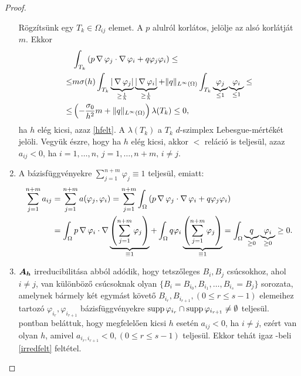 \begin{proof}
\begin{enumerate}[label=(\roman*)]
			Rögzítsünk egy $T_k \in \Omega_{ij}$ elemet. A $p$ alulról korlátos, jelölje az alsó korlátját $m$. Ekkor
			\begin{align*}
				 &\int_{T_k} \left( p \operatorname{\nabla} \varphi_j \cdot \operatorname{\nabla} \varphi_i  + q \varphi_j \varphi_i \right) \leq \\ 
				 \leq  &m \sigma(h) \int_{T_k} \underbrace{|\operatorname{\nabla} \varphi_j|}_{\geq \frac{1}{h}} \underbrace{|\operatorname{\nabla} \varphi_i|}_{\geq \frac{1}{h}}   + \|q\|_{L^{\infty}(\Omega)} \int_{T_k} \underbrace{\varphi_j}_{\leq 1} \underbrace{\varphi_i}_{\leq 1} \leq \\
				 \leq &\left(-\frac{\sigma_0}{h^2} m + \|q\|_{L^{\infty}(\Omega)}\right)  \lambda(T_k) \leq 0,
			\end{align*}
			 ha $h$ elég kicsi, azaz \eqref{hfelt}. A $\lambda(T_k)$ a $T_k$ $d$-szimplex Lebesgue-mértékét jelöli. Vegyük észre, hogy ha $h$ elég kicsi, akkor $<$ reláció is teljesül, azaz $a_{ij} < 0$, ha $i = 1, \ldots, n, \, j = 1, \ldots, n+m, \, i \neq j$. 
			 \label{szigpozbiz}
		\item A bázisfüggvényekre $\sum_{j = 1}^{n+m}\varphi_{j} \equiv 1 $ teljesül, emiatt:
			\begin{align*}
				\sum_{j = 1}^{n+m} a_{ij} &= \sum_{j = 1}^{n+m} a(\varphi_j,\varphi_i) = \sum_{j = 1}^{n+m} \int_{\Omega} \left( p \operatorname{\nabla} \varphi_j \cdot \operatorname{\nabla} \varphi_i  + q \varphi_j \varphi_i \right) 	\\						
				&=  \int_{\Omega}  p \operatorname{\nabla} \varphi_i \cdot \operatorname{\nabla} \underbrace{\left(\sum_{j = 1}^{n+m} \varphi_j \right)}_{\equiv 1}    + \int_{\Omega} q  \varphi_i \underbrace{\left(\sum_{j = 1}^{n+m} \varphi_j \right)}_{\equiv 1} 
				= \int_{\Omega} \underbrace{q}_{\geq 0} \underbrace{\varphi_i}_{\geq 0}	\geq 0.
			\end{align*}
		\item  $\bm{A_h}$ irreducibilitása abból adódik, hogy tetszőleges $B_i, B_j$ csúcsokhoz, ahol $i \neq j$, van különböző csúcsoknak olyan $\{ B_i = B_{i_0}, B_{i_1}, \ldots, B_{i_s}= B_j \}$ sorozata, amelynek bármely két egymást követő $B_{i_r}, B_{i_{r+1}}, (0 \leq r \leq s-1)$ elemeihez tartozó $\varphi_{i_r}, \varphi_{i_{r+1}} $  bázisfüggvényekre $\operatorname{supp} \varphi_{i_r} \cap \operatorname{supp} \varphi_{i_{r+1}} \neq \emptyset$ teljesül.  pontban beláttuk, hogy megfelelően kicsi $h$ esetén $a_{ij} < 0$, ha $i \neq j$, ezért van olyan $h$, amivel $a_{i_r,i_{r+1}} < 0, (0 \leq r \leq s-1)$ teljesül. Ekkor tehát igaz -beli \ref{irredfelt} feltétel.


\end{enumerate}
\end{proof}
